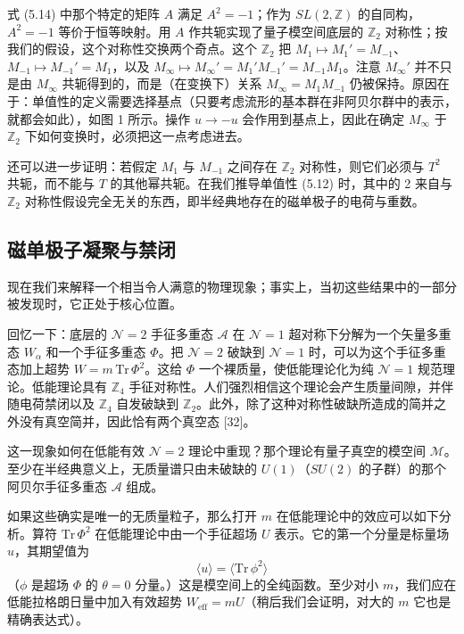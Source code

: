 \documentclass[11pt,a4paper,UTF8,fontset=fandol]{ctexart}
\theoremstyle{plain}
\theoremstyle{definition}
\begin{document}
式 (5.14) 中那个特定的矩阵 $A$ 满足 $A^2=-1$；作为 $SL(2,\mathbb Z)$ 的自同构，$A^2=-1$ 等价于恒等映射。用 $A$ 作共轭实现了量子模空间底层的 $\mathbb Z_2$ 对称性；按我们的假设，这个对称性交换两个奇点。这个 $\mathbb Z_2$ 把 $M_1\mapsto M_1'=M_{-1}$、$M_{-1}\mapsto M_{-1}'=M_1$，以及 $M_\infty\mapsto M_\infty'=M_1'M_{-1}'=M_{-1}M_1$。注意 $M_\infty'$ 并不只是由 $M_\infty$ 共轭得到的，而是（在变换下）关系 $M_\infty=M_1M_{-1}$ 仍被保持。原因在于：单值性的定义需要选择基点（只要考虑流形的基本群在非阿贝尔群中的表示，就都会如此），如图 1 所示。操作 $u\to -u$ 会作用到基点上，因此在确定 $M_\infty$ 于 $\mathbb Z_2$ 下如何变换时，必须把这一点考虑进去。

还可以进一步证明：若假定 $M_1$ 与 $M_{-1}$ 之间存在 $\mathbb Z_2$ 对称性，则它们必须与 $T^2$ 共轭，而不能与 $T$ 的其他幂共轭。在我们推导单值性 (5.12) 时，其中的 2 来自与 $\mathbb Z_2$ 对称性假设完全无关的东西，即半经典地存在的磁单极子的电荷与重数。

\subsection{磁单极子凝聚与禁闭}

现在我们来解释一个相当令人满意的物理现象；事实上，当初这些结果中的一部分被发现时，它正处于核心位置。

回忆一下：底层的 $\mathcal N=2$ 手征多重态 $\mathcal A$ 在 $\mathcal N=1$ 超对称下分解为一个矢量多重态 $W_\alpha$ 和一个手征多重态 $\Phi$。把 $\mathcal N=2$ 破缺到 $\mathcal N=1$ 时，可以为这个手征多重态加上超势 $W=m\,\mathrm{Tr}\,\Phi^2$。这给 $\Phi$ 一个裸质量，使低能理论化为纯 $\mathcal N=1$ 规范理论。低能理论具有 $\mathbb Z_4$ 手征对称性。人们强烈相信这个理论会产生质量间隙，并伴随电荷禁闭以及 $\mathbb Z_4$ 自发破缺到 $\mathbb Z_2$。此外，除了这种对称性破缺所造成的简并之外没有真空简并，因此恰有两个真空态 [32]。

这一现象如何在低能有效 $\mathcal N=2$ 理论中重现？那个理论有量子真空的模空间 $\mathcal M$。至少在半经典意义上，无质量谱只由未破缺的 $U(1)$（$SU(2)$ 的子群）的那个阿贝尔手征多重态 $\mathcal A$ 组成。

如果这些确实是唯一的无质量粒子，那么打开 $m$ 在低能理论中的效应可以如下分析。算符 $\mathrm{Tr}\,\Phi^2$ 在低能理论中由一个手征超场 $U$ 表示。它的第一个分量是标量场 $u$，其期望值为
\begin{equation}
    \langle u\rangle = \langle \mathrm{Tr}\,\phi^2\rangle \tag{5.16}
\end{equation}
（$\phi$ 是超场 $\Phi$ 的 $\theta=0$ 分量。）这是模空间上的全纯函数。至少对小 $m$，我们应在低能拉格朗日量中加入有效超势 $W_{\mathrm{eff}}=mU$（稍后我们会证明，对大的 $m$ 它也是精确表达式）。
\end{document}
